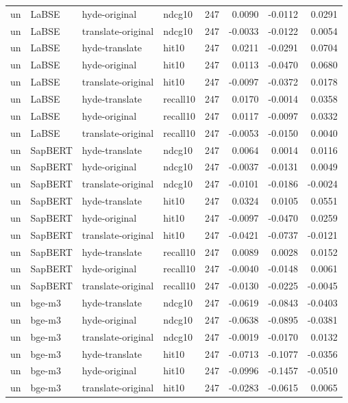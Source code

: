 \begin{tabular}{llllrrrr}
un & LaBSE & hyde-original & ndcg10 & 247 & 0.0090 & -0.0112 & 0.0291 \\
un & LaBSE & translate-original & ndcg10 & 247 & -0.0033 & -0.0122 & 0.0054 \\
un & LaBSE & hyde-translate & hit10 & 247 & 0.0211 & -0.0291 & 0.0704 \\
un & LaBSE & hyde-original & hit10 & 247 & 0.0113 & -0.0470 & 0.0680 \\
un & LaBSE & translate-original & hit10 & 247 & -0.0097 & -0.0372 & 0.0178 \\
un & LaBSE & hyde-translate & recall10 & 247 & 0.0170 & -0.0014 & 0.0358 \\
un & LaBSE & hyde-original & recall10 & 247 & 0.0117 & -0.0097 & 0.0332 \\
un & LaBSE & translate-original & recall10 & 247 & -0.0053 & -0.0150 & 0.0040 \\
un & SapBERT & hyde-translate & ndcg10 & 247 & 0.0064 & 0.0014 & 0.0116 \\
un & SapBERT & hyde-original & ndcg10 & 247 & -0.0037 & -0.0131 & 0.0049 \\
un & SapBERT & translate-original & ndcg10 & 247 & -0.0101 & -0.0186 & -0.0024 \\
un & SapBERT & hyde-translate & hit10 & 247 & 0.0324 & 0.0105 & 0.0551 \\
un & SapBERT & hyde-original & hit10 & 247 & -0.0097 & -0.0470 & 0.0259 \\
un & SapBERT & translate-original & hit10 & 247 & -0.0421 & -0.0737 & -0.0121 \\
un & SapBERT & hyde-translate & recall10 & 247 & 0.0089 & 0.0028 & 0.0152 \\
un & SapBERT & hyde-original & recall10 & 247 & -0.0040 & -0.0148 & 0.0061 \\
un & SapBERT & translate-original & recall10 & 247 & -0.0130 & -0.0225 & -0.0045 \\
un & bge-m3 & hyde-translate & ndcg10 & 247 & -0.0619 & -0.0843 & -0.0403 \\
un & bge-m3 & hyde-original & ndcg10 & 247 & -0.0638 & -0.0895 & -0.0381 \\
un & bge-m3 & translate-original & ndcg10 & 247 & -0.0019 & -0.0170 & 0.0132 \\
un & bge-m3 & hyde-translate & hit10 & 247 & -0.0713 & -0.1077 & -0.0356 \\
un & bge-m3 & hyde-original & hit10 & 247 & -0.0996 & -0.1457 & -0.0510 \\
un & bge-m3 & translate-original & hit10 & 247 & -0.0283 & -0.0615 & 0.0065 \\

\end{tabular}

